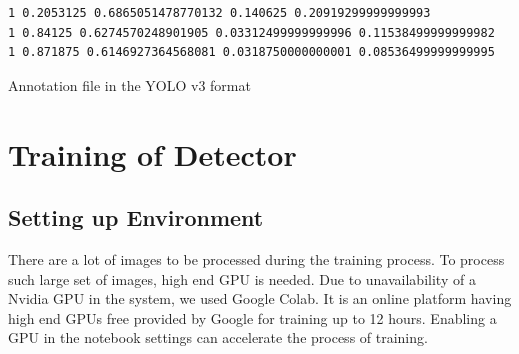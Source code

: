 \begin{longlisting}
\begin{verbatim}
1 0.2053125 0.6865051478770132 0.140625 0.20919299999999993
1 0.84125 0.6274570248901905 0.03312499999999996 0.11538499999999982
1 0.871875 0.6146927364568081 0.0318750000000001 0.08536499999999995
\end{verbatim}
\caption{Annotation file in the YOLO v3 format}
\label{listing:11}
\end{longlisting}

\section{Training of Detector}
\subsection{Setting up Environment}
There are a lot of images to be processed during the training process. To process such large set of  images, high end GPU is needed. Due to unavailability of a Nvidia GPU in the system, we used Google Colab. It is an  online platform having high end GPUs free provided by Google for training up to 12 hours. Enabling a GPU in the notebook settings can accelerate the process of training. 
